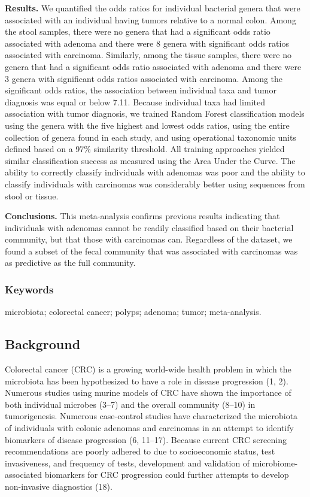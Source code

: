 \documentclass[12pt,]{article}
\begin{document}
\textbf{Results.} We quantified the odds ratios for individual bacterial
genera that were associated with an individual having tumors relative to
a normal colon. Among the stool samples, there were no genera that had a
significant odds ratio associated with adenoma and there were 8 genera
with significant odds ratios associated with carcinoma. Similarly, among
the tissue samples, there were no genera that had a significant odds
ratio associated with adenoma and there were 3 genera with significant
odds ratios associated with carcinoma. Among the significant odds
ratios, the association between individual taxa and tumor diagnosis was
equal or below 7.11. Because individual taxa had limited association
with tumor diagnosis, we trained Random Forest classification models
using the genera with the five highest and lowest odds ratios, using the
entire collection of genera found in each study, and using operational
taxonomic units defined based on a 97\% similarity threshold. All
training approaches yielded similar classification success as measured
using the Area Under the Curve. The ability to correctly classify
individuals with adenomas was poor and the ability to classify
individuals with carcinomas was considerably better using sequences from
stool or tissue.

\textbf{Conclusions.} This meta-analysis confirms previous results
indicating that individuals with adenomas cannot be readily classified
based on their bacterial community, but that those with carcinomas can.
Regardless of the dataset, we found a subset of the fecal community that
was associated with carcinomas was as predictive as the full community.

\subsubsection{Keywords}\label{keywords}

microbiota; colorectal cancer; polyps; adenoma; tumor; meta-analysis.

\newpage

\subsection{Background}\label{background}

Colorectal cancer (CRC) is a growing world-wide health problem in which
the microbiota has been hypothesized to have a role in disease
progression (1, 2). Numerous studies using murine models of CRC have
shown the importance of both individual microbes (3--7) and the overall
community (8--10) in tumorigenesis. Numerous case-control studies have
characterized the microbiota of individuals with colonic adenomas and
carcinomas in an attempt to identify biomarkers of disease progression
(6, 11--17). Because current CRC screening recommendations are poorly
adhered to due to socioeconomic status, test invasiveness, and frequency
of tests, development and validation of microbiome-associated biomarkers
for CRC progression could further attempts to develop non-invasive
diagnostics (18).
\end{document}
